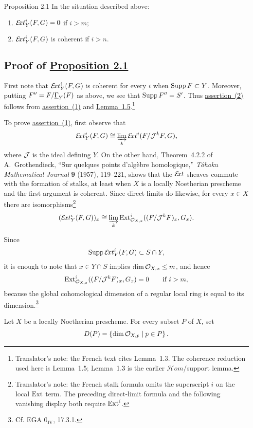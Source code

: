 \begin{sgastatement}{Proposition 2.1}
In the situation described above:
\begin{enumerate}
\item $\mathcal E\!xt_Y^i(F,G)=0$ if $i>m$;
\item $\mathcal E\!xt_Y^i(F,G)$ is coherent if $i>n$.
\end{enumerate}
\end{sgastatement}

\subsection*{Proof of \hyperref[VII.2.1]{Proposition 2.1}}

First note that $\mathcal E\!xt_Y^i(F,G)$ is coherent for every $i$ when
$\operatorname{Supp} F\subset Y$. Moreover, putting $F''=F/\underline{\Gamma}_Y(F)$ as above, we see
that $\operatorname{Supp} F''=S'$. Thus \hyperref[VII.2.1]{assertion~(2)} follows from \hyperref[VII.2.1]{assertion~(1)} and
\hyperref[VII.1.5]{Lemma~1.5}.\footnote{Translator's note: the French text cites Lemma~1.3. The
coherence reduction used here is Lemma~1.5; Lemma~1.3 is the earlier
$\mathcal Hom$/support lemma.}

To prove \hyperref[VII.2.1]{assertion~(1)}, first observe that
\[
  \mathcal E\!xt_Y^i(F,G)\cong
  \varinjlim_k \mathcal E\!xt^i(F/\mathcal J^kF,G),
\]
where $\mathcal J$ is the ideal defining $Y$. On the other hand, Theorem~4.2.2 of
A.~Grothendieck, ``Sur quelques points d'alg\`ebre homologique,''
\emph{T\^ohoku Mathematical Journal} \textbf{9} (1957), 119--221, shows that
the $\mathcal E\!xt$ sheaves commute with the formation of stalks, at least when
$X$ is a locally Noetherian prescheme and the first argument is coherent.
Since direct limits do likewise, for every $x\in X$ there are
isomorphisms\footnote{Translator's note: the French stalk formula omits the
superscript $i$ on the local $\operatorname{Ext}$ term. The preceding direct-limit formula
and the following vanishing display both require $\operatorname{Ext}^i$.}
\[
  (\mathcal E\!xt_Y^i(F,G))_x\cong
  \varinjlim_k
  \operatorname{Ext}^i_{\mathcal O_{X,x}}((F/\mathcal J^kF)_x,G_x).
\]

Since
\[
  \operatorname{Supp}\mathcal E\!xt_Y^i(F,G)\subset S\cap Y,
\]
it is enough to note that $x\in Y\cap S$ implies
$\dim\mathcal O_{X,x}\leq m$, and hence
\[
  \operatorname{Ext}^i_{\mathcal O_{X,x}}((F/\mathcal J^kF)_x,G_x)=0
  \qquad\text{if }i>m,
\]
because the global cohomological dimension of a regular local ring is equal
to its dimension.\footnote{Cf. EGA $0_{\mathrm{IV}}$, 17.3.1.}

Let $X$ be a locally Noetherian prescheme. For every subset $P$ of $X$, set
\[
  D(P)=\left\{\dim\mathcal O_{X,p}\mid p\in P\right\}.
\]

